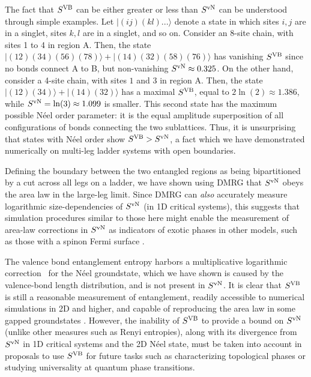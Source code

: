 \documentclass[prl,aps,twocolumn,floatfix,amsmath,amssymb,superscriptaddress,tightenlines]{revtex4}
\begin{document}
The fact  that $S^{\rm VB}$ can be either greater or less than $S^{ \rm
vN}$ can be understood through simple examples. Let $|(ij)(kl)...\rangle$
denote a state in which sites $i,j$ are in a singlet, sites $k,l$ are in a
singlet, and so on.  Consider an 8-site chain, with sites 1 to 4 in region
A. Then, the state $|(12)(34)(56)(78)\rangle+|(14)(32)(58)(76)\rangle$ has
vanishing $S^{\rm VB}$ since no bonds connect A to B, but
non-vanishing $S^{ \rm vN} \approx 0.325$.  On the other hand, consider a 4-site chain,
with sites $1$ and $3$ in region A. Then, the state
$|(12)(34)\rangle+|(14)(32)\rangle$ has a maximal $S^{\rm VB}$, equal to
$2\ln(2) \approx 1.386$, while $S^{ \rm vN} = \ln(3) \approx 1.099$ is smaller.  This second state
has the maximum possible N\'eel order parameter: it is the
equal amplitude superposition of all configurations of bonds connecting the
two sublattices.
Thus, it is unsurprising that states with N\'eel order show $S^{\rm VB} > S^{ \rm vN}$,
a fact which we have demonstrated numerically on multi-leg ladder systems with open boundaries.


Defining the boundary between the two entangled regions as being bipartitioned by a cut across all legs
on a ladder, we have shown using DMRG that $S^{ \rm vN}$ obeys the area law in the large-leg limit.   
Since DMRG can {\it also} accurately measure logarithmic size-dependencies of $S^{\rm vN}$ (in 1D critical systems), this suggests that simulation procedures similar to those here might enable the measurement of area-law corrections in $S^{\rm vN}$ as indicators of exotic phases in other models, such as those with
a spinon Fermi surface \cite{BoseMetal}.

The valence bond entanglement entropy harbors a multiplicative %
logarithmic
correction~\cite{Alet,Chh} for the N\'eel groundstate, which we have shown is caused by the valence-bond length distribution, and is not present in $S^{\rm vN}$.  It is clear that $S^{\rm VB}$ is still a reasonable measurement of entanglement, readily accessible to numerical simulations in 2D and higher, and capable of reproducing the area law in some gapped groundstates \cite{Alet,Chh}.  However, the inability of  $S^{\rm VB}$ to provide a bound on 
$S^{\rm vN}$ (unlike other measures such as Renyi entropies), along with
its divergence from $S^{\rm vN}$ in 1D critical systems and the 2D N\'eel
state, must be taken into account in proposals to use $S^{\rm VB}$ for
future tasks such as characterizing topological phases 
 or studying universality at quantum phase transitions.
\end{document}
